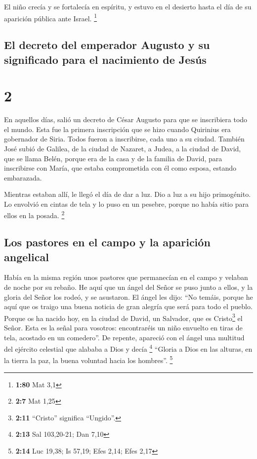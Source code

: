  El niño crecía y se fortalecía en espíritu, y estuvo en
el desierto hasta el día de su aparición pública ante Israel.
\footnote{\textbf{1:80} Mat 3,1}

\hypertarget{el-decreto-del-emperador-augusto-y-su-significado-para-el-nacimiento-de-jesuxfas}{%
\subsection{El decreto del emperador Augusto y su significado para el
nacimiento de
Jesús}\label{el-decreto-del-emperador-augusto-y-su-significado-para-el-nacimiento-de-jesuxfas}}

\hypertarget{section-1}{%
\section{2}\label{section-1}}

 En aquellos días, salió un decreto de César Augusto para
que se inscribiera todo el mundo.  Esta fue la primera
inscripción que se hizo cuando Quirinius era gobernador de Siria.
 Todos fueron a inscribirse, cada uno a su ciudad.
 También José subió de Galilea, de la ciudad de Nazaret, a
Judea, a la ciudad de David, que se llama Belén, porque era de la casa y
de la familia de David,  para inscribirse con María, que
estaba comprometida con él como esposa, estando embarazada.

 Mientras estaban allí, le llegó el día de dar a luz.
 Dio a luz a su hijo primogénito. Lo envolvió en cintas de
tela y lo puso en un pesebre, porque no había sitio para ellos en la
posada. \footnote{\textbf{2:7} Mat 1,25}

\hypertarget{los-pastores-en-el-campo-y-la-apariciuxf3n-angelical}{%
\subsection{Los pastores en el campo y la aparición
angelical}\label{los-pastores-en-el-campo-y-la-apariciuxf3n-angelical}}

 Había en la misma región unos pastores que permanecían en
el campo y velaban de noche por su rebaño.  He aquí que un
ángel del Señor se puso junto a ellos, y la gloria del Señor los rodeó,
y se asustaron.  El ángel les dijo: ``No temáis, porque
he aquí que os traigo una buena noticia de gran alegría que será para
todo el pueblo.  Porque os ha nacido hoy, en la ciudad de
David, un Salvador, que es Cristo\footnote{\textbf{2:11} ``Cristo''
  significa ``Ungido''.} el Señor.  Esta es la señal para
vosotros: encontraréis un niño envuelto en tiras de tela, acostado en un
comedero''.  De repente, apareció con el ángel una
multitud del ejército celestial que alababa a Dios y decía \footnote{\textbf{2:13}
  Sal 103,20-21; Dan 7,10}  ``Gloria a Dios en las
alturas, en la tierra la paz, la buena voluntad hacia los hombres''.
\footnote{\textbf{2:14} Luc 19,38; Is 57,19; Efes 2,14; Efes 2,17}

